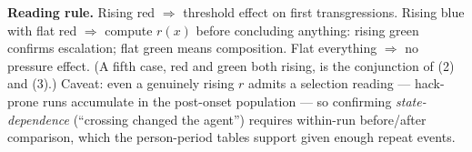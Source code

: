 \documentclass[10pt]{article}
\begin{document}
\textbf{Reading rule.} Rising red $\Rightarrow$ threshold effect on first transgressions.
Rising blue with flat red $\Rightarrow$ compute $r(x)$ before concluding anything: rising green
confirms escalation; flat green means composition. Flat everything $\Rightarrow$ no
pressure effect. (A fifth case, red and green both rising, is the conjunction of (2) and (3).)
Caveat: even a genuinely rising $r$ admits a selection reading --- hack-prone runs accumulate in
the post-onset population --- so confirming \emph{state-dependence} (``crossing changed the
agent'') requires within-run before/after comparison, which the person-period tables support
given enough repeat events.
\end{document}
